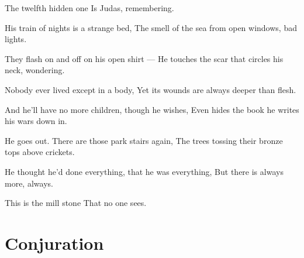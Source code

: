 \documentclass[english,11pt,letterpaper,onecolumn]{scrbook}
\begin{document}
\begin{poem}
\begin{stanza}
The twelfth hidden one \verseline
Is Judas, remembering.
\end{stanza}

\begin{stanza}
His train of nights is a strange bed, \verseline
The smell of the sea from open windows, bad lights.
\end{stanza}

\begin{stanza}
They flash on and off on his open shirt ---  \verseline
He touches the scar that circles his neck, wondering.
\end{stanza}

\begin{stanza}
Nobody ever lived except in a body, \verseline
Yet its wounds are always deeper than flesh.
\end{stanza}

\begin{stanza}
And he'll have no more children, though he wishes, \verseline
Even hides the book he writes his wars down in.
\end{stanza}

\begin{stanza}
He goes out.  There are those park stairs again, \verseline
The trees tossing their bronze tops above crickets.
\end{stanza}

\begin{stanza}
He thought he'd done everything, that he was everything, \verseline
But there is always more, always.  
\end{stanza}

\begin{stanza}
This is the mill stone \verseline
That no one sees.
\end{stanza}
\end{poem}

\newpage
\section{Conjuration}
\end{document}
